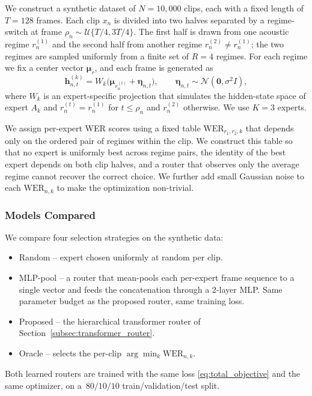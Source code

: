 \documentclass[journal]{IEEEtran}
\begin{document}
We construct a synthetic dataset of $N=10{,}000$ clips, each with a
fixed length of $T=128$ frames. Each clip $x_n$ is divided into two
halves separated by a regime-switch at frame $\rho_n\sim\mathcal{U}\{T/4,3T/4\}$.
The first half is drawn from one acoustic regime $r_n^{(1)}$ and the
second half from another regime $r_n^{(2)}\neq r_n^{(1)}$; the two
regimes are sampled uniformly from a finite set of $R=4$ regimes.
For each regime we fix a center vector $\boldsymbol{\mu}_r$, and each
frame is generated as
\[
\mathbf{h}_{n,t}^{(k)} =
W_k\bigl(\boldsymbol{\mu}_{r_n^{(t)}}+\boldsymbol{\eta}_{n,t}\bigr),
\qquad
\boldsymbol{\eta}_{n,t}\sim\mathcal{N}(\mathbf{0},\sigma^2 I),
\]
where $W_k$ is an expert-specific projection that simulates the
hidden-state space of expert $A_k$ and $r_n^{(t)}=r_n^{(1)}$ for
$t\le\rho_n$ and $r_n^{(2)}$ otherwise. We use $K=3$ experts.

We assign per-expert WER scores using a fixed table $\mathrm{WER}_{r_1,r_2,k}$ that depends only on the ordered pair of regimes within the clip. We construct this table so that no expert is uniformly best across regime pairs, the identity of the best expert depends on both clip halves, and a router that observes only the average regime cannot recover the correct choice. We further add small Gaussian noise to each $\mathrm{WER}_{n,k}$ to make the optimization non-trivial.

\subsubsection{Models Compared}

We compare four selection strategies on the synthetic data:
\begin{itemize}
    \item Random -- expert chosen uniformly at random per clip.
    \item MLP-pool -- a router that mean-pools each per-expert frame
    sequence to a single vector and feeds the concatenation through
    a 2-layer MLP. Same parameter budget as the proposed router,
    same training loss.
    \item Proposed -- the hierarchical transformer router of
    Section~\ref{subsec:transformer_router}.
    \item Oracle -- selects the per-clip
    $\arg\min_k\mathrm{WER}_{n,k}$.
\end{itemize}
Both learned routers are trained with the same loss
\eqref{eq:total_objective} and the same optimizer, on a $\,80/10/10$
train/validation/test split.
\end{document}
